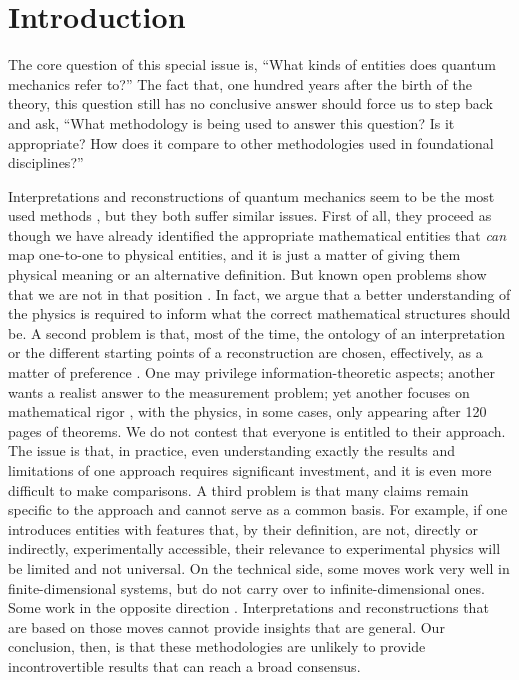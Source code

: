 \documentclass[entropy,article,submit,moreauthors]{Definitions/mdpi}
\begin{document}
\section{Introduction}

The core question of this special issue is, ``What kinds of entities does quantum mechanics refer to?'' The fact that, one hundred years after the birth of the theory, this question still has no conclusive answer \cite{SchlosshauerKoflerZeilinger2013,JedlickaEtAl2025} should force us to step back and ask, ``What methodology is being used to answer this question? Is it appropriate? How does it compare to other methodologies used in foundational disciplines?''

Interpretations and reconstructions of quantum mechanics seem to be the most used methods \cite{Myrvold2022,Grinbaum2007,Berghofer2024}, but they both suffer similar issues. First of all, they proceed as though we have already identified the appropriate mathematical entities that \emph{can} map one-to-one to physical entities, and it is just a matter of giving them physical meaning or an alternative definition. But known open problems show that we are not in that position \cite{CarcassiCalderonAidala2025,JaffeWitten2006,Gallavotti2006,Heathcote1990,Ruetsche2011,EarmanFraser2006,Redei1996,Toader2021}. In fact, we argue that a better understanding of the physics is required to inform what the correct mathematical structures should be. A second problem is that, most of the time, the ontology of an interpretation or the different starting points of a reconstruction are chosen, effectively, as a matter of preference \cite{SchlosshauerKoflerZeilinger2013,JedlickaEtAl2025,Grinbaum2007,Berghofer2024}. One may privilege information-theoretic aspects; another wants a realist answer to the measurement problem; yet another focuses on mathematical rigor \cite{Berghofer2024,AlloriEtAl2008,KronzLupher2024}, with the physics, in some cases, only appearing after 120 pages of theorems. We do not contest that everyone is entitled to their approach. The issue is that, in practice, even understanding exactly the results and limitations of one approach requires significant investment, and it is even more difficult to make comparisons. A third problem is that many claims remain specific to the approach and cannot serve as a common basis. For example, if one introduces entities with features that, by their definition, are not, directly or indirectly, experimentally accessible, their relevance to experimental physics will be limited and not universal. On the technical side, some moves work very well in finite-dimensional systems, but do not carry over to infinite-dimensional ones. Some work in the opposite direction \cite{Ruetsche2011}. Interpretations and reconstructions that are based on those moves cannot provide insights that are general. Our conclusion, then, is that these methodologies are unlikely to provide incontrovertible results that can reach a broad consensus.
\end{document}
